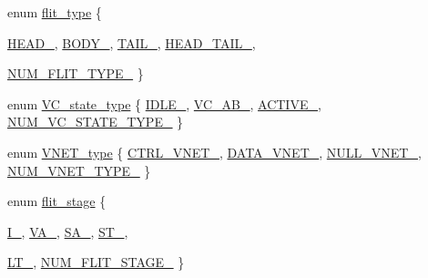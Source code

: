 \begin{DoxyCompactItemize}
\item 
enum \hyperlink{NetworkHeader_8hh_a2c6c8cfc6307d086e578093535798328}{flit\_\-type} \{ \par
\hyperlink{NetworkHeader_8hh_a2c6c8cfc6307d086e578093535798328a9166399b253eff5d79578c7816c6e2ee}{HEAD\_\-}, 
\hyperlink{NetworkHeader_8hh_a2c6c8cfc6307d086e578093535798328a959140a9f3253e227e84f60044e39655}{BODY\_\-}, 
\hyperlink{NetworkHeader_8hh_a2c6c8cfc6307d086e578093535798328a9fa3c0aede2c8cdf20f0c6410bf6896e}{TAIL\_\-}, 
\hyperlink{NetworkHeader_8hh_a2c6c8cfc6307d086e578093535798328ad9b885aa8b1f4823e416518e205e5ffc}{HEAD\_\-TAIL\_\-}, 
\par
\hyperlink{NetworkHeader_8hh_a2c6c8cfc6307d086e578093535798328ae096376123c24adb526671288b1f3ce5}{NUM\_\-FLIT\_\-TYPE\_\-}
 \}
\item 
enum \hyperlink{NetworkHeader_8hh_aaafaa208359111dcd9f4d47ff377da76}{VC\_\-state\_\-type} \{ \hyperlink{NetworkHeader_8hh_aaafaa208359111dcd9f4d47ff377da76a18b46dea81f1c4b313f0291111682145}{IDLE\_\-}, 
\hyperlink{NetworkHeader_8hh_aaafaa208359111dcd9f4d47ff377da76ad6720dcce1c5352be9d53460376fdf5c}{VC\_\-AB\_\-}, 
\hyperlink{NetworkHeader_8hh_aaafaa208359111dcd9f4d47ff377da76a767d5451ce027a7881f351e2961a96a2}{ACTIVE\_\-}, 
\hyperlink{NetworkHeader_8hh_aaafaa208359111dcd9f4d47ff377da76ab7d87f6d4be9b3e9df77dbbbe972c689}{NUM\_\-VC\_\-STATE\_\-TYPE\_\-}
 \}
\item 
enum \hyperlink{NetworkHeader_8hh_a101d399ed954ebfe3619308e600de4d3}{VNET\_\-type} \{ \hyperlink{NetworkHeader_8hh_a101d399ed954ebfe3619308e600de4d3a1781405fb51f9f09f3c4d311ee18fd0d}{CTRL\_\-VNET\_\-}, 
\hyperlink{NetworkHeader_8hh_a101d399ed954ebfe3619308e600de4d3abfbd450873f8a1968fda519825404bc7}{DATA\_\-VNET\_\-}, 
\hyperlink{NetworkHeader_8hh_a101d399ed954ebfe3619308e600de4d3add0d18811b4f7962d7e60a772fd8d503}{NULL\_\-VNET\_\-}, 
\hyperlink{NetworkHeader_8hh_a101d399ed954ebfe3619308e600de4d3a51933c9d9d8c99b70b54e92ea4285438}{NUM\_\-VNET\_\-TYPE\_\-}
 \}
\item 
enum \hyperlink{NetworkHeader_8hh_a1af1206699d48009a5cbd0c2c1d7ce15}{flit\_\-stage} \{ \par
\hyperlink{NetworkHeader_8hh_a1af1206699d48009a5cbd0c2c1d7ce15a299c4755a5c78b16628b2b0ab51ab044}{I\_\-}, 
\hyperlink{NetworkHeader_8hh_a1af1206699d48009a5cbd0c2c1d7ce15a7c78d367ff57f5828d403f9bb9b4730d}{VA\_\-}, 
\hyperlink{NetworkHeader_8hh_a1af1206699d48009a5cbd0c2c1d7ce15abeef85b0243e79bc85fcc75d3d3ab21b}{SA\_\-}, 
\hyperlink{NetworkHeader_8hh_a1af1206699d48009a5cbd0c2c1d7ce15a1985eabc3cffde1b9bc176a26bb70ce7}{ST\_\-}, 
\par
\hyperlink{NetworkHeader_8hh_a1af1206699d48009a5cbd0c2c1d7ce15a4b0a185f1b87371cde313f4389e208d2}{LT\_\-}, 
\hyperlink{NetworkHeader_8hh_a1af1206699d48009a5cbd0c2c1d7ce15a104018a63d3a4c2453dc1f309e276314}{NUM\_\-FLIT\_\-STAGE\_\-}
 \}
\end{DoxyCompactItemize}


